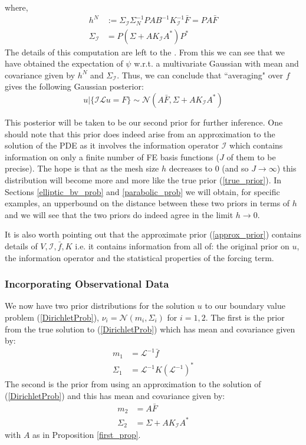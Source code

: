 where,
\begin{align}
    h^{N}&:=\Sigma_{\mathcal{I}}\Sigma_{N}^{-1}PAB^{-1}K_{\mathcal{I}}^{-1}\bar{F}=PA\bar{F} \\
    \Sigma_{\mathcal{I}}&=P(\Sigma+AK_{\mathcal{I}}A^{*})P^{*}
\end{align}
The details of this computation are left to the \textcolor{blue}{}. From this we can see that we have obtained the expectation of $\psi$ w.r.t. a multivariate Gaussian with mean and covariance given by $h^{N}$ and $\Sigma_{\mathcal{I}}$. Thus, we can conclude that ``averaging" over $f$ gives the following Gaussian posterior:
\begin{equation}
    u|\{\mathcal{I}\mathcal{L}u=F\}\sim\mathcal{N}\left(A\bar{F},\Sigma+AK_{\mathcal{I}}A^{*}\right)
\end{equation}
\qedsymbol

This posterior will be taken to be our second prior for further inference. One should note that this prior does indeed arise from an approximation to the solution of the PDE as it involves the information operator $\mathcal{I}$ which contains information on only a finite number of FE basis functions ($J$ of them to be precise). The hope is that as the mesh size $h$ decreases to $0$ (and so $J\rightarrow\infty$) this distribution will become more and more like the true prior (\ref{true_prior}). In Sections \textcolor{blue}{\ref{elliptic_bv_prob}} and \textcolor{blue}{\ref{parabolic_prob}} we will obtain, for specific examples, an upperbound on the distance between these two priors in terms of $h$ and we will see that the two priors do indeed agree in the limit $h\rightarrow 0$.

It is also worth pointing out that the approximate prior (\ref{approx_prior}) contains details of $V,\mathcal{I},\bar{f},K$ i.e. it contains information from all of: the original prior on $u$, the information operator and the statistical properties of the forcing term.

\subsubsection{Incorporating Observational Data}

We now have two prior distributions for the solution $u$ to our boundary value problem (\ref{DirichletProb}), $\nu_{i}=\mathcal{N}(m_{i},\Sigma_{i})$ for $i=1,2$. The first is the prior from the true solution to (\ref{DirichletProb}) which has mean and covariance given by:
\begin{align}
    m_{1} &= \mathcal{L}^{-1}\bar{f} \\
    \Sigma_{1} &= \mathcal{L}^{-1}K(\mathcal{L}^{-1})^{*}
\end{align}
The second is the prior from using an approximation to the solution of (\ref{DirichletProb}) and this has mean and covariance given by:
\begin{align}
    m_{2} &= A\bar{F} \\
    \Sigma_{2} &= \Sigma + AK_{\mathcal{I}}A^{*}
\end{align}
with $A$ as in Proposition \textcolor{blue}{\ref{first_prop}}.

